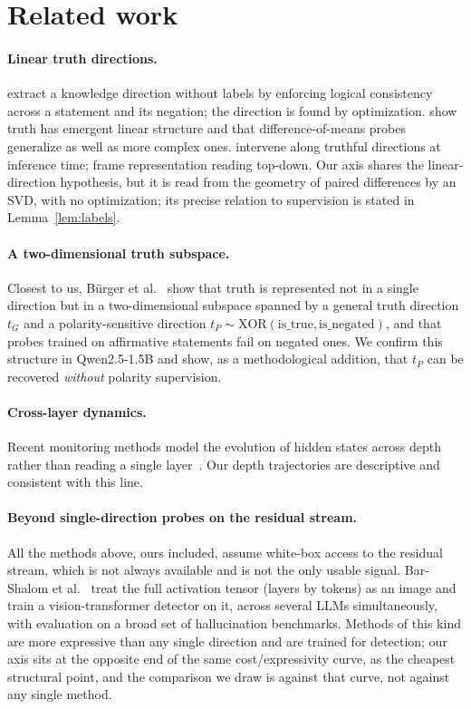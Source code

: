 \documentclass[11pt]{article}
\begin{document}
\section{Related work}


\paragraph{Linear truth directions.} \cite{burns2023} extract a knowledge
direction without labels by enforcing logical consistency across a statement
and its negation; the direction is found by optimization. \cite{marks2024}
show truth has emergent linear structure and that difference-of-means probes
generalize as well as more complex ones. \cite{li2023} intervene along
truthful directions at inference time; \cite{zou2023} frame representation
reading top-down. Our axis shares the linear-direction hypothesis, but it is
read from the geometry of paired differences by an SVD, with no optimization;
its precise relation to supervision is stated in Lemma~\ref{lem:labels}.

\paragraph{A two-dimensional truth subspace.} Closest to us, B\"urger et
al.~\cite{burger2024} show that truth is represented not in a single direction
but in a two-dimensional subspace spanned by a general truth direction $t_G$
and a polarity-sensitive direction $t_P \sim
\mathrm{XOR}(\text{is\_true},\text{is\_negated})$, and that probes trained on
affirmative statements fail on negated ones. We confirm this structure in
Qwen2.5-1.5B and show, as a methodological addition, that $t_P$ can be
recovered \emph{without} polarity supervision.

\paragraph{Cross-layer dynamics.} Recent monitoring methods model the
evolution of hidden states across depth rather than reading a single
layer~\cite{icr2025,hsad2025}. Our depth trajectories are descriptive and
consistent with this line.

\paragraph{Beyond single-direction probes on the residual stream.} All the
methods above, ours included, assume white-box access to the residual stream,
which is not always available and is not the only usable signal. Bar-Shalom et
al.~\cite{barshalom2025} treat the full activation tensor (layers by tokens)
as an image and train a vision-transformer detector on it, across several LLMs
simultaneously, with evaluation on a broad set of hallucination benchmarks.
Methods of this kind are more expressive than any single direction and are
trained for detection; our axis sits at the opposite end of the same
cost/expressivity curve, as the cheapest structural point, and the comparison
we draw is against that curve, not against any single method.
\end{document}
